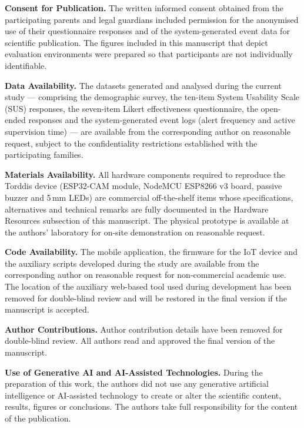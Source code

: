 \documentclass[pdflatex,sn-apa]{sn-jnl}%
\begin{document}
    \textbf{Consent for Publication.}
        The written informed consent obtained from the participating parents and legal guardians included permission for the anonymised use of their questionnaire responses and of the system-generated event data for scientific publication. The figures included in this manuscript that depict evaluation environments were prepared so that participants are not individually identifiable.

    \textbf{Data Availability.}
        The datasets generated and analysed during the current study --- comprising the demographic survey, the ten-item System Usability Scale (SUS) responses, the seven-item Likert effectiveness questionnaire, the open-ended responses and the system-generated event logs (alert frequency and active supervision time) --- are available from the corresponding author on reasonable request, subject to the confidentiality restrictions established with the participating families.

    \textbf{Materials Availability.}
        All hardware components required to reproduce the Torddis device (ESP32-CAM module, NodeMCU ESP8266 v3 board, passive buzzer and 5\,mm LEDs) are commercial off-the-shelf items whose specifications, alternatives and technical remarks are fully documented in the Hardware Resources subsection of this manuscript. The physical prototype is available at the authors' laboratory for on-site demonstration on reasonable request.

    \textbf{Code Availability.}
        The mobile application, the firmware for the IoT device and the auxiliary scripts developed during the study are available from the corresponding author on reasonable request for non-commercial academic use. The location of the auxiliary web-based tool used during development has been removed for double-blind review and will be restored in the final version if the manuscript is accepted.

    \textbf{Author Contributions.}
        Author contribution details have been removed for double-blind review. All authors read and approved the final version of the manuscript.

    \textbf{Use of Generative AI and AI-Assisted Technologies.}
        During the preparation of this work, the authors did not use any generative artificial intelligence or AI-assisted technology to create or alter the scientific content, results, figures or conclusions. The authors take full responsibility for the content of the publication.


\begin{appendices}
    
\end{appendices}



\end{document}
